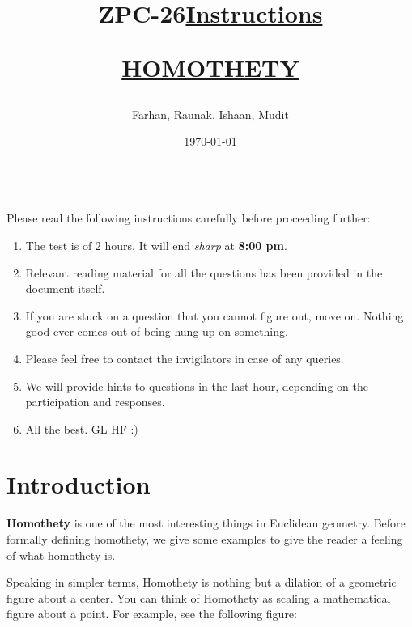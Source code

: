 \documentclass[12pt]{article}
\title{ZPC-26}
\author{Farhan, Raunak, Ishaan, Mudit}
\date{\today}
\theoremstyle{definition}
\begin{document}
\maketitle
\title{\textbf{\underline{\fontsize{18}{12}\selectfont Instructions}}}\\
Please read the following instructions carefully before proceeding further:\\
\begin{enumerate}
\item The test is of 2 hours. It will end \textit{sharp} at \textbf{8:00 pm}.
\item Relevant reading material for all the questions has been provided in the document itself.
\item If you are stuck on a question that you cannot figure out, move on. Nothing good ever comes out of being hung up on something.
\item Please feel free to contact the invigilators in case of any queries.
\item We will provide hints to questions in the last hour, depending on the participation and responses.
\item All the best. GL HF :)\\
\end{enumerate}
\bigskip
\maketitle
\newpage
\title{\begin{center}\textbf{\underline{\fontsize{16}{12}\selectfont HOMOTHETY}}\end{center}}
\section{Introduction}
\textbf{Homothety} is one of the most interesting things in Euclidean geometry. Before formally defining homothety, we give some examples to give the reader a feeling of what homothety is.

Speaking in simpler terms, Homothety is nothing but a dilation of a geometric figure about a center. You can think of Homothety as scaling a mathematical figure about a point. For example, see the following figure:
\end{document}

